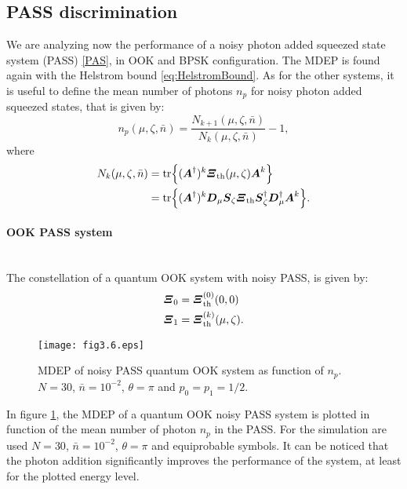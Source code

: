     \subsection{PASS discrimination}
        We are analyzing now the performance of a noisy photon added squeezed state system (PASS)
        \ref{PAS}, in OOK and BPSK configuration. The MDEP is found again with the Helstrom bound
        \ref{eq:HelstromBound}.
        As for the other systems, it is useful to define the mean number of photons $n_p$ for noisy 
        photon added squeezed states, that is given by:
        \begin{equation}
            n_p(\mu,\zeta,\bar{n}) = \frac{N_{k+1}(\mu,\zeta,\bar{n})}{N_k(\mu,\zeta,\bar{n})}-1,
            \label{eq:np_PASS}
        \end{equation}
        where
        \begin{equation}
            \begin{split}
                N_k(\mu,\zeta,\bar{n}) &= \tr{(\Operator{A}^\dagger)^k \Operator{\varXi}_{\mathrm{th}}(\mu,\zeta) \Operator{A}^k}\\
                                       &= \tr{(\Operator{A}^\dagger)^k \Operator{D}_\mu \Operator{S}_\zeta \Operator{\varXi}_{\mathrm{th}}
                                        \Operator{S}_\zeta^\dagger \Operator{D}_\mu^\dagger \Operator{A}^k}.
            \end{split}
        \end{equation}

        \paragraph{OOK PASS system}\mbox{}\\
        The constellation of a quantum OOK system with noisy PASS, is given by:
        \begin{subequations}
            \begin{align}
                \Operator{\varXi}_0 &= \Operator{\varXi}_{\mathrm{th}}^{(0)}(0,0)\\
                \Operator{\varXi}_1 &= \Operator{\varXi}_{\mathrm{th}}^{(k)}(\mu,\zeta).
            \end{align}
        \end{subequations}
        \begin{figure}[t]
            \begin{center}
                \texttt{[image: fig3.6.eps]}
                \caption{MDEP of noisy PASS quantum OOK system as function of $n_p$.\\
                $N=30$, $\bar{n}=10^{-2}$, $\theta=\pi$ and $p_0=p_1=1/2$.}
                \label{fig:3.6}
            \end{center}
        \end{figure}
        In figure \ref{fig:3.6}, the MDEP of a quantum OOK noisy PASS system is plotted in function
        of the mean number of photon $n_p$ in the PASS. For the simulation are used $N=30$, $\bar{n}=10^{-2}$, $\theta=\pi$ and
        equiprobable symbols.
        It can be noticed that the photon addition significantly improves the performance of the system,
        at least for the plotted energy level.


